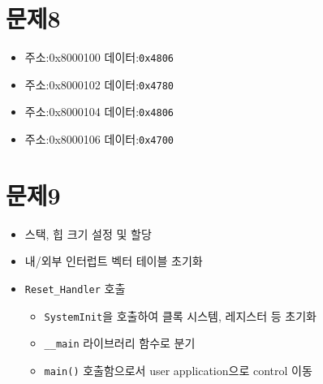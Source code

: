 \documentclass{article}
\begin{document}
\section*{문제8 \small{}}
\begin{mdframed}
\begin{itemize}
    \item 주소:0x8000100 \hspace{3cm} 데이터:\texttt{0x4806}
    \item 주소:0x8000102 \hspace{3cm} 데이터:\texttt{0x4780}
    \item 주소:0x8000104 \hspace{3cm} 데이터:\texttt{0x4806}
    \item 주소:0x8000106 \hspace{3cm} 데이터:\texttt{0x4700}
\end{itemize}
\end{mdframed}

\section*{문제9 \small{}}
 \begin{mdframed}
    \begin{itemize}
        \item 스택, 힙 크기 설정 및 할당
        \item 내/외부 인터럽트 벡터 테이블 초기화
        \item \texttt{Reset\_Handler} 호출
            \begin{itemize}
                \item \texttt{SystemInit}을 호출하여 클록 시스템, 레지스터 등 초기화
                \item \texttt{\_\_main} 라이브러리 함수로 분기
                \item \texttt{main()} 호출함으로서 user application으로 control 이동
            \end{itemize}
    \end{itemize}
 \end{mdframed}
\end{document}
